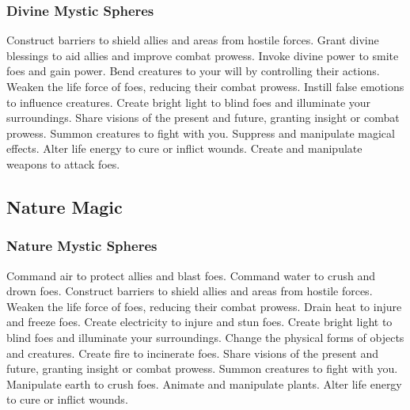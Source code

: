 \subsubsection{Divine Mystic Spheres}\label{Divine Mystic Spheres}
\begin{spelllist}
 Construct barriers to shield allies and areas from hostile forces.
 Grant divine blessings to aid allies and improve combat prowess.
 Invoke divine power to smite foes and gain power.
 Bend creatures to your will by controlling their actions.
 Weaken the life force of foes, reducing their combat prowess.
 Instill false emotions to influence creatures.
 Create bright light to blind foes and illuminate your surroundings.
 Share visions of the present and future, granting insight or combat prowess.
 Summon creatures to fight with you.
 Suppress and manipulate magical effects.
 Alter life energy to cure or inflict wounds.
 Create and manipulate weapons to attack foes.
\end{spelllist}



\small
\subsection{Nature Magic}\label{Nature Magic}
\subsubsection{Nature Mystic Spheres}\label{Nature Mystic Spheres}
\begin{spelllist}
 Command air to protect allies and blast foes.
 Command water to crush and drown foes.
 Construct barriers to shield allies and areas from hostile forces.
 Weaken the life force of foes, reducing their combat prowess.
 Drain heat to injure and freeze foes.
 Create electricity to injure and stun foes.
 Create bright light to blind foes and illuminate your surroundings.
 Change the physical forms of objects and creatures.
 Create fire to incinerate foes.
 Share visions of the present and future, granting insight or combat prowess.
 Summon creatures to fight with you.
 Manipulate earth to crush foes.
 Animate and manipulate plants.
 Alter life energy to cure or inflict wounds.
\end{spelllist}



